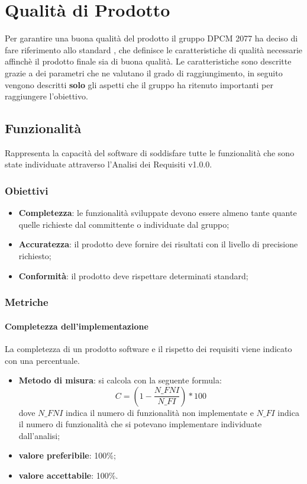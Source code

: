 \section{Qualità di Prodotto}

Per garantire una buona qualità del prodotto il gruppo DPCM 2077 ha deciso di fare riferimento allo standard ,
che definisce le caratteristiche di qualità necessarie affinchè il prodotto finale sia di buona qualità.
Le caratteristiche sono descritte grazie a dei parametri che ne valutano il grado di raggiungimento, in seguito vengono descritti \textbf{solo} gli aspetti che il gruppo 
ha ritenuto importanti per raggiungere l'obiettivo.

\subsection{Funzionalità}
Rappresenta la capacità del software di soddisfare tutte le funzionalità che sono state individuate attraverso l'Analisi dei Requisiti v1.0.0.
\subsubsection{Obiettivi}
\begin{itemize}
\item {\textbf{Completezza}: le funzionalità sviluppate devono essere almeno tante quante quelle richieste dal committente o individuate dal gruppo;}
\item {\textbf{Accuratezza}: il prodotto deve fornire dei risultati con il livello di precisione richiesto;}
\item {\textbf{Conformità}: il prodotto deve rispettare determinati standard;} 
\end{itemize}

\subsubsection{Metriche}
\paragraph{Completezza dell'implementazione}
La completezza di un prodotto software e il rispetto dei requisiti viene indicato con una percentuale.
\begin{itemize}
\item \textbf{Metodo di misura}: si calcola con la seguente formula:
\[C = (1- \frac{N\_FNI}{N\_FI}) * 100\]
dove $N\_FNI$ indica il numero di funzionalità non implementate e $N\_FI$ indica il numero di funzionalità che si potevano implementare individuate dall'analisi;
\item \textbf{valore preferibile}: 100\%;
\item \textbf{valore accettabile}: 100\%.
\end{itemize}

